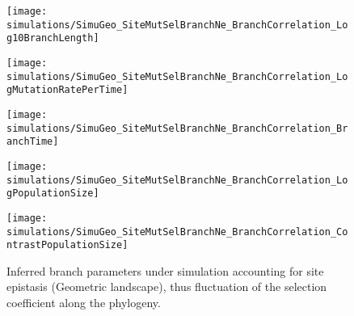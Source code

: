 \begin{figure}[H]
    \centering
    \begin{minipage}{0.32\linewidth}
        \texttt{[image: simulations/SimuGeo\_SiteMutSelBranchNe\_BranchCorrelation\_Log10BranchLength]}
    \end{minipage}    \hfill
    \begin{minipage}{0.32\linewidth}
        \texttt{[image: simulations/SimuGeo\_SiteMutSelBranchNe\_BranchCorrelation\_LogMutationRatePerTime]}
    \end{minipage}    \hfill
    \begin{minipage}{0.32\linewidth}
        \texttt{[image: simulations/SimuGeo\_SiteMutSelBranchNe\_BranchCorrelation\_BranchTime]}
    \end{minipage}    \hfill
    \begin{minipage}{0.32\linewidth}
        \texttt{[image: simulations/SimuGeo\_SiteMutSelBranchNe\_BranchCorrelation\_LogPopulationSize]}
    \end{minipage}
    \begin{minipage}{0.32\linewidth}
        \texttt{[image: simulations/SimuGeo\_SiteMutSelBranchNe\_BranchCorrelation\_ContrastPopulationSize]}
    \end{minipage} \hfill
    \caption[Inferred branch parameters for SimuGeo]{
    Inferred branch parameters under simulation accounting for site epistasis (Geometric landscape), thus fluctuation of the selection coefficient along the phylogeny.
    }
\end{figure}


\begin{table}[H]
    \centering
    \noindent{}
    \caption[Entropy of amino-acids for SimuGeo]{
    Estimated amino-acids entropy under under simulation accounting for site epistasis (Geometric landscape), thus fluctuation of the selection coefficient along the phylogeny.
    Obtained with the inference model of site selection for amino-acid, and branch fluctuation of $\Ne$ (left column), or under the assumption of constant $\Ne$ (right column)}
\end{table}

